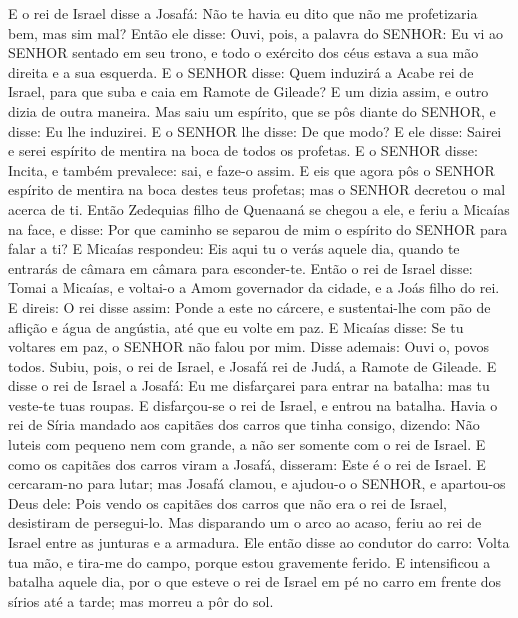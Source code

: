 {E o rei de Israel disse a Josafá: Não te havia eu dito que não me profetizaria bem, mas sim mal?
Então ele disse: Ouvi, pois, a palavra do SENHOR: Eu vi ao SENHOR sentado em seu trono, e todo o exército dos céus estava a sua mão direita e a sua esquerda.
E o SENHOR disse: Quem induzirá a Acabe rei de Israel, para que suba e caia em Ramote de Gileade? E um dizia assim, e outro dizia de outra maneira.
Mas saiu um espírito, que se pôs diante do SENHOR, e disse: Eu lhe induzirei. E o SENHOR lhe disse: De que modo?
E ele disse: Sairei e serei espírito de mentira na boca de todos os profetas. E o SENHOR disse: Incita, e também prevalece: sai, e faze-o assim.
E eis que agora pôs o SENHOR espírito de mentira na boca destes teus profetas; mas o SENHOR decretou o mal acerca de ti.
Então Zedequias filho de Quenaaná se chegou a ele, e feriu a Micaías na face, e disse: Por que caminho se separou de mim o espírito do SENHOR para falar a ti?
E Micaías respondeu: Eis aqui tu o verás aquele dia, quando te entrarás de câmara em câmara para esconder-te.
Então o rei de Israel disse: Tomai a Micaías, e voltai-o a Amom governador da cidade, e a Joás filho do rei.
E direis: O rei disse assim: Ponde a este no cárcere, e sustentai-lhe com pão de aflição e água de angústia, até que eu volte em paz.
E Micaías disse: Se tu voltares em paz, o SENHOR não falou por mim. Disse ademais: Ouvi o, povos todos.
Subiu, pois, o rei de Israel, e Josafá rei de Judá, a Ramote de Gileade.
E disse o rei de Israel a Josafá: Eu me disfarçarei para entrar na batalha: mas tu veste-te tuas roupas. E disfarçou-se o rei de Israel, e entrou na batalha.
Havia o rei de Síria mandado aos capitães dos carros que tinha consigo, dizendo: Não luteis com pequeno nem com grande, a não ser somente com o rei de Israel.
E como os capitães dos carros viram a Josafá, disseram: Este é o rei de Israel. E cercaram-no para lutar; mas Josafá clamou, e ajudou-o o SENHOR, e apartou-os Deus dele:
Pois vendo os capitães dos carros que não era o rei de Israel, desistiram de persegui-lo.
Mas disparando um o arco ao acaso, feriu ao rei de Israel entre as junturas e a armadura. Ele então disse ao condutor do carro: Volta tua mão, e tira-me do campo, porque estou gravemente ferido.
E intensificou a batalha aquele dia, por o que esteve o rei de Israel em pé no carro em frente dos sírios até a tarde; mas morreu a pôr do sol.

}
